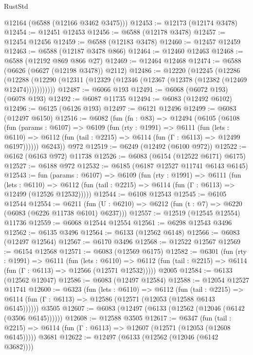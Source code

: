 \begin{lexlean}{RustStd}
\begin{coremodule}
      @12164
      (@6588 (@12166 @3462 @3475)))
@12453 := @12173 (@12174 @3478)
@12454 := @12451 @12453
@12456 := @6588 (@12178 @3478)
@12457 := @12454 @12456
@12459 := @6588 (@12183 @3478)
@12460 := @12457 @12459
@12463 := @6588 (@12187 @3478 @866)
@12464 := @12460 @12463
@12468 := @6588 (@12192 @869 @866 @27)
@12469 := @12464 @12468
@12474 := @6588 (@6626 (@6627 (@12198 @3478)) @2112)
@12486 := @12220
    (@12245
      (@12286
        (@12288 (@12290 (@12311 (@12329 (@12346 (@12367 (@12378 (@12382 (@12469 @12474)))))))))))
@12487 := @6066 @193
@12491 := @6068 (@6072 @193) (@6078 @193)
@12492 := @6087 @11735
@12494 := @6083 (@12492 @6102)
@12496 := @6125 (@6126 @193)
@12497 := @6121 @12496
@12499 := @6083 (@12497 @6150)
@12516 := @6082
    (fun (fn : @83) =>
    @12494
      (@6105
        (@6108
          (fun (params : @6107) =>
          @6109
            (fun (rty : @1991) =>
            @6111
              (fun (lets : @6110) =>
              @6112 (fun (tail : @2215) => @6114 (fun (Γ : @6113) => @12499 @6197))))))
        @6243))
    @972
@12519 := @6249 (@12492 (@6100 @972))
@12522 := @6162 (@6163 @972) @11738
@12526 := @6083 (@6154 (@12522 @6171) @6175)
@12527 := @6188 @972
@12532 := @6185 (@6187 @12527 @11741 @6143 @6145)
@12543 := fun (params : @6107) =>
  @6109
    (fun (rty : @1991) =>
    @6111
      (fun (lets : @6110) =>
      @6112 (fun (tail : @2215) => @6114 (fun (Γ : @6113) => @12499 (@12526 @12532)))))
@12544 := @6108 @12543
@12545 := @6105 @12544
@12554 := @6211
    (fun (U : @6210) => @6212 (fun (t : @7) => @6220 (@6083 (@6226 @11738 @6101) @6237)))
@12557 := @12519 (@12545 @12554) @11736
@12559 := @6068 @12544 @12554
@12561 := @6298 @12543 @3496
@12562 := @6135 @3496
@12564 := @6133 (@12562 @6148)
@12566 := @6083 (@12497 @12564)
@12567 := @6170 @3496
@12568 := @12522 @12567
@12569 := @6154 @12568
@12571 := @6083 (@12569 @6175)
@12582 := @6301
    (fun (rty : @1991) =>
    @6111
      (fun (lets : @6110) =>
      @6112 (fun (tail : @2215) => @6114 (fun (Γ : @6113) => @12566 (@12571 @12532)))))
    @2005
@12584 := @6133 (@12562 @12047)
@12586 := @6083 (@12497 @12584)
@12588 := @12054 @12527 @11741
@12600 := @6323
    (fun (lets : @6110) =>
    @6112
      (fun (tail : @2215) =>
      @6114 (fun (Γ : @6113) => @12586 (@12571 (@12053 (@12588 @6143 @6145))))))
    @3505
@12607 := @6083 (@12497 (@6133 (@12562 (@12046 (@6142 (@3506 @6145))))))
@12608 := @12588 @3505
@12617 := @6347
    (fun (tail : @2215) => @6114 (fun (Γ : @6113) => @12607 (@12571 (@12053 (@12608 @6145)))))
    @3681
@12622 := @12497 (@6133 (@12562 (@12046 (@6142 @3682))))

\end{coremodule}
\end{lexlean}
